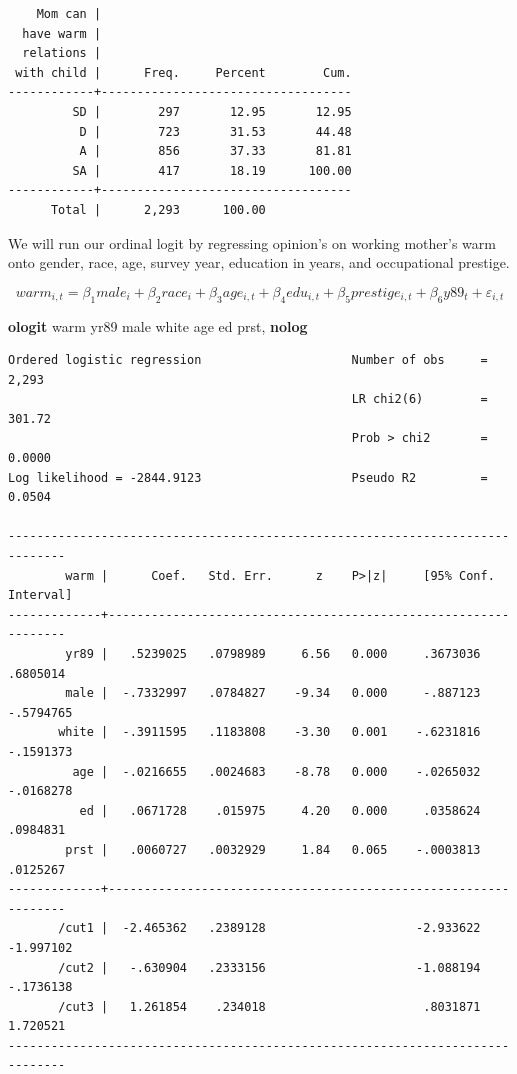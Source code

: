 \documentclass[
]{book}
\newenvironment{Shaded}{\begin{snugshade}}{\end{snugshade}}
\newcommand{\BaseNTok}[1]{\textcolor[rgb]{0.00,0.00,0.81}{#1}}
\newcommand{\KeywordTok}[1]{\textcolor[rgb]{0.13,0.29,0.53}{\textbf{#1}}}
\newcommand{\NormalTok}[1]{#1}
\begin{document}
\begin{verbatim}
    Mom can |
  have warm |
  relations |
 with child |      Freq.     Percent        Cum.
------------+-----------------------------------
         SD |        297       12.95       12.95
          D |        723       31.53       44.48
          A |        856       37.33       81.81
         SA |        417       18.19      100.00
------------+-----------------------------------
      Total |      2,293      100.00
\end{verbatim}

We will run our ordinal logit by regressing opinion's on working mother's warm onto gender, race,
age, survey year, education in years, and occupational prestige.

\[ warm_{i,t} = \beta_1 male_i + \beta_2 race_i + \beta_3 age_{i,t} + \beta_4 edu_{i,t} + \beta_5 prestige_{i,t} + \beta_6 y89_t + \varepsilon_{i,t} \]

\begin{Shaded}
\begin{Highlighting}[]
\KeywordTok{ologit}\NormalTok{ warm yr89 male }\BaseNTok{white}\NormalTok{ age ed prst, }\KeywordTok{nolog}
\end{Highlighting}
\end{Shaded}

\begin{verbatim}
Ordered logistic regression                     Number of obs     =      2,293
                                                LR chi2(6)        =     301.72
                                                Prob > chi2       =     0.0000
Log likelihood = -2844.9123                     Pseudo R2         =     0.0504

------------------------------------------------------------------------------
        warm |      Coef.   Std. Err.      z    P>|z|     [95% Conf. Interval]
-------------+----------------------------------------------------------------
        yr89 |   .5239025   .0798989     6.56   0.000     .3673036    .6805014
        male |  -.7332997   .0784827    -9.34   0.000     -.887123   -.5794765
       white |  -.3911595   .1183808    -3.30   0.001    -.6231816   -.1591373
         age |  -.0216655   .0024683    -8.78   0.000    -.0265032   -.0168278
          ed |   .0671728    .015975     4.20   0.000     .0358624    .0984831
        prst |   .0060727   .0032929     1.84   0.065    -.0003813    .0125267
-------------+----------------------------------------------------------------
       /cut1 |  -2.465362   .2389128                     -2.933622   -1.997102
       /cut2 |   -.630904   .2333156                     -1.088194   -.1736138
       /cut3 |   1.261854    .234018                      .8031871    1.720521
------------------------------------------------------------------------------
\end{verbatim}
\end{document}
